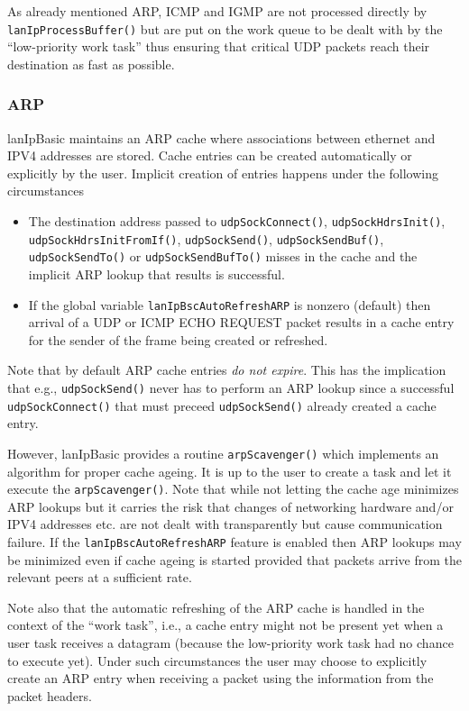 \documentclass{article}
\newcommand{\lip}{lanIpBasic}
\newcommand{\ethn}{ethernet}
\newcommand{\lipc}[1]{{\tt #1}}
\newcommand{\cmd}[1]{{\tt #1}}
\begin{document}
As already mentioned ARP, ICMP and IGMP are not processed directly
by \cmd{lanIpProcessBuffer()} but are put on the work queue to
be dealt with by the ``low-priority work task'' thus ensuring
that critical UDP packets reach their destination as fast as 
possible.

    \subsubsection{ARP}
\lip{} maintains an ARP cache where associations between \ethn{} and
IPV4 addresses are stored. Cache entries can be created automatically
or explicitly by the user. Implicit creation of entries happens under
the following circumstances
\begin{itemize}
\item The destination address passed to \lipc{udpSockConnect()},
      \lipc{udpSockHdrsInit()}, \lipc{udpSockHdrsInitFromIf()},
      \lipc{udpSockSend()}, \lipc{udpSockSendBuf()}, \lipc{udpSockSendTo()}
      or \lipc{udpSockSendBufTo()} misses in the
      cache and the implicit ARP lookup that results is successful.
\item If the global variable \lipc{lanIpBscAutoRefreshARP} is nonzero (default)
      then arrival of a UDP or ICMP ECHO REQUEST packet results in a 
      cache entry for the sender of the frame being created or refreshed.
\end{itemize}
Note that by default ARP cache entries {\em do not expire}. This has
the implication that e.g., \lipc{udpSockSend()} never has to perform
an ARP lookup since a successful \lipc{udpSockConnect()} that must 
preceed \lipc{udpSockSend()} already created a cache entry.

However, \lip{} provides a routine \lipc{arpScavenger()} which implements
an algorithm for proper cache ageing. It is up to the user to create a
task and let it execute the \lipc{arpScavenger()}. Note that while not
letting the cache age minimizes ARP lookups but it carries the risk that
changes of networking hardware and/or IPV4 addresses etc. are not
dealt with transparently but cause communication failure. If the
\lipc{lanIpBscAutoRefreshARP} feature is enabled then ARP lookups
may be minimized even if cache ageing is started provided that 
packets arrive from the relevant peers at a sufficient rate.

Note also that the automatic refreshing of the ARP cache is
handled in the context of the ``work task'', i.e., a cache entry
might not be present yet when a user task receives a datagram
(because the low-priority work task had no chance to execute yet).
Under such circumstances the user may choose to explicitly create
an ARP entry when receiving a packet using the information from
the packet headers.
\end{document}
